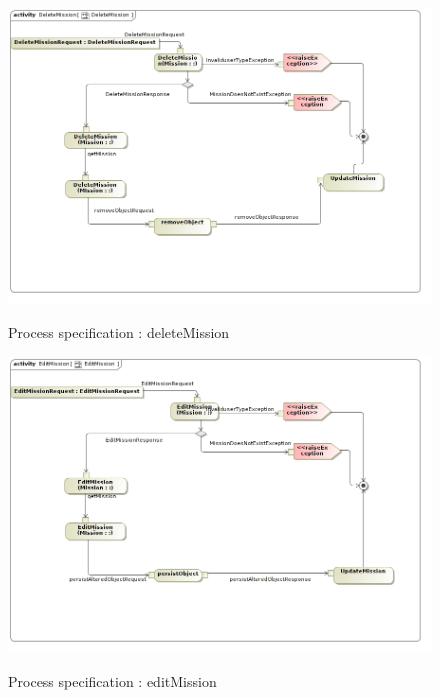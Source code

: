 \documentclass{article}
\begin{document}
		\begin{figure}[H]
				\includegraphics[width=\textwidth]{DeleteMissionActivity diagram.jpg}  \\
				\caption{Process specification : deleteMission}
				\end{figure}
		\begin{figure}[H]
				\includegraphics[width=\textwidth]{EditMissionActivityDiagram.jpg}  \\
				\caption{Process specification : editMission}
				\end{figure}
\end{document}
